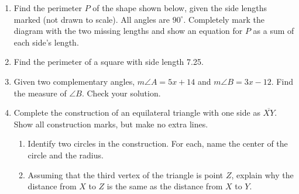 \documentclass[12pt, twoside]{article}
\begin{document}
\begin{enumerate}
  \item Find the perimeter $P$ of the shape shown below, given the side lengths marked (not drawn to scale). All angles are $90^\circ$. Completely mark the diagram with the two missing lengths and show an equation for $P$ as a sum of each side's length.
  \begin{flushleft}
  \end{flushleft} \vspace{2cm}

  \item Find the perimeter of a square with side length 7.25. \vspace{3cm}

  \item Given two complementary angles, $m\angle A = 5x+14$ and $m\angle B = 3x-12$. Find the measure of $\angle B$. Check your solution. \vspace{3.5cm} 
 
\newpage
  \item Complete the construction of an equilateral triangle with one side as $\overline{XY}$. Show all construction marks, but make no extra lines. \vspace{3cm}
  \begin{center}
  \end{center} \vspace{3cm}
  \begin{enumerate}
    \item Identify two circles in the construction. For each, name the center of the circle and the radius.  \vspace{3cm}
    \item Assuming that the third vertex of the triangle is point $Z$, explain why the distance from $X$ to $Z$ is the same as the distance from $X$ to $Y$.
  \end{enumerate}


\end{enumerate}
\end{document}
